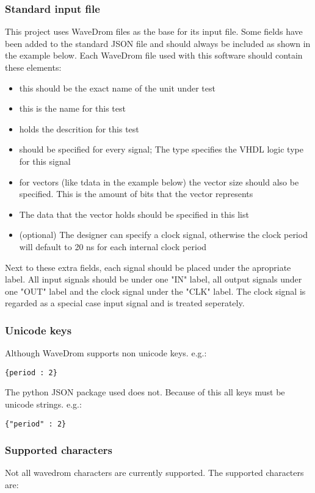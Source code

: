 \subsubsection{Standard input file}
This project uses WaveDrom files as the base for its input file. Some fields have been added to the standard JSON file and should always be included as shown in the example below. Each WaveDrom file used with this software should contain these elements:
\begin{itemize}
	\item [name(*):] this should be the exact name of the unit under test
	\item [test:] this is the name for this test
	\item [description:] holds the descrition for this test
	\item [type:] should be specified for every signal; The type specifies the VHDL logic type for this signal
	\item [vector\_size:] for vectors (like tdata in the example below) the vector size should also be specified. This is the amount of bits that the vector represents
	\item [data:] The data that the vector holds should be specified in this list
	\item [clock\_period:] (optional) The designer can specify a clock signal, otherwise the clock period will default to 20 ns for each internal clock period
\end{itemize}
Next to these extra fields, each signal should be placed under the apropriate label. All input signals should be under one "IN" label, all output signals under one "OUT" label and the clock signal under the "CLK" label. The clock signal is regarded as a special case input signal and is treated seperately.\newpage
\subsubsection{Unicode keys}
Although WaveDrom supports non unicode keys. e.g.:
\begin{lstlisting}[style=json]
{period : 2}
\end{lstlisting}
The python JSON package used does not. Because of this all keys must be unicode strings. e.g.:
\begin{lstlisting}[style=json]
{"period" : 2}
\end{lstlisting}
\subsubsection{Supported characters}
Not all wavedrom characters are currently supported. The supported characters are:
\npar


